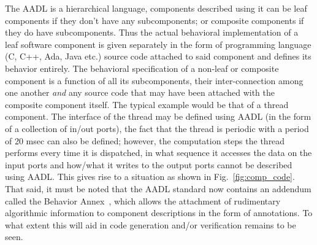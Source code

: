 The AADL is a hierarchical language, components described using it can
be leaf components if they don't have any subcomponents; or composite
components if they do have subcomponents. Thus the actual behavioral
implementation of a leaf software component is given separately in the
form of programming language (C, C++, Ada, Java etc.) source code
attached to said component and defines its behavior entirely. The
behavioral specification of a non-leaf or composite component is a
function of all its subcomponents, their inter-connection among one
another \emph{and} any source code that may have been attached with
the composite component itself. The typical example would be that of a
thread component. The interface of the thread may be defined using
AADL (in the form of a collection of in/out ports), the fact that the
thread is periodic with a period of 20 msec can also be defined;
however, the computation steps the thread performs every time it is
dispatched, in what sequence it accesses the data on the input ports
and how/what it writes to the output ports cannot be described using
AADL. This gives rise to a situation as shown in
Fig.~\ref{fig:comp_code}. That said, it must be noted that the AADL
standard now contains an addendum called the Behavior
Annex~\cite{filali@iceccs07}, which allows the attachment of
rudimentary algorithmic information to component descriptions in the
form of annotations. To what extent this will aid in code generation
and/or verification remains to be seen.

